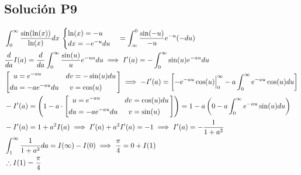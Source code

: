 \begin{CajaTitulo}{\begin{center}\subsection{Solución P9}\end{center}}
    \vspace{0.5cm}
    \begin{align*}
        & \int_{0}^{\infty}\frac{\sin(\ln(x))}{\ln(x)}dx \: \cambio{\ln(x) = -u}{dx = -e^{-u}du} = \int_{\infty}^{0}\frac{\sin(-u)}{-u}e^{-u}(-du)   \\
        & \frac{d}{da} I(a) =  \frac{d}{da} \int_{0}^{\infty}\frac{\sin(u)}{u}e^{-ua}du \implies I'(a) = -\int_{0}^{\infty}\sin(u)e^{-au}du\\ 
        & \PorPartes{e^{-au}}{-a e^{-au}du  }{-\sin(u)du}{\cos(u)} \implies -I'(a) = \left[-e^{-au}\cos(u)\Big|_{0}^{\infty} - a\int_{0}^{\infty}e^{-au}\cos(u)du\right] \\ 
        & -I'(a) = \left(1 - a \cdot \PorPartes{e^{-au}}{-ae^{-au}du}{\cos(u)du}{\sin(u)} \right) = 1 - a\left(0 - a\int_{0}^{\infty}e^{-au}\sin(u)du\right)\\ 
        & -I'(a) = 1 + a^2I(a) \implies I'(a) + a^2I'(a) = -1 \implies I'(a) =  -\frac{1}{1+a^2}\\
        & \int_{1}^{\infty} \frac{1}{1+a^2}da = I(\infty) - I(0) \implies  \frac{\pi}{4} = 0 + I(1)\\
        & \therefore I(1) = \frac{\pi}{4}
    \end{align*}
\end{CajaTitulo}